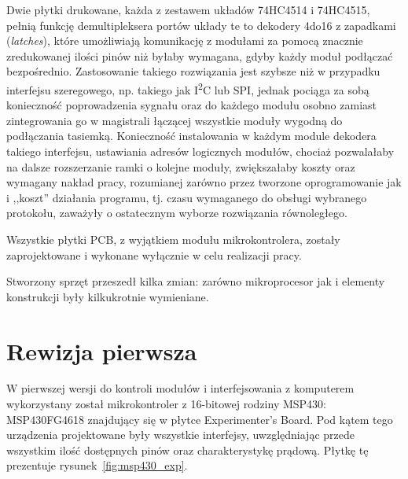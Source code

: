 Dwie płytki drukowane, każda z zestawem układów 74HC4514 i 74HC4515, pełnią funkcję demultipleksera portów \pauza układy te to dekodery 4\ppauza{}do\ppauza{}16 z zapadkami (\textsl{latches}), które umożliwiają komunikację z modułami za pomocą znacznie zredukowanej ilości pinów niż byłaby wymagana, gdyby każdy moduł podłączać bezpośrednio.
Zastosowanie takiego rozwiązania jest szybsze niż w przypadku interfejsu szeregowego, np. takiego jak I\textsuperscript{2}C lub SPI, jednak pociąga za sobą konieczność poprowadzenia sygnału  oraz  do każdego modułu osobno zamiast zintegrowania go w magistrali łączącej wszystkie moduły wygodną do podłączania tasiemką.
Konieczność instalowania w każdym module dekodera takiego interfejsu, ustawiania adresów logicznych modułów, chociaż pozwalałaby na dalsze rozszerzanie ramki o kolejne moduły, zwiększałaby koszty oraz wymagany nakład pracy, rozumianej zarówno przez tworzone oprogramowanie jak i ,,koszt'' działania programu, tj. czasu wymaganego do obsługi wybranego protokołu, zaważyły o ostatecznym wyborze rozwiązania równoległego.

Wszystkie płytki PCB, z wyjątkiem modułu mikrokontrolera, zostały zaprojektowane i wykonane wyłącznie w celu realizacji pracy.

Stworzony sprzęt przeszedł kilka zmian: zarówno mikroprocesor jak i elementy konstrukcji były kilkukrotnie wymieniane.\\

\section{Rewizja pierwsza}

W pierwszej wersji do kontroli modułów i interfejsowania z komputerem wykorzystany został mikrokontroler z 16-bitowej rodziny MSP430: MSP430FG4618 znajdujący się w płytce Experimenter's Board.
Pod kątem tego urządzenia projektowane były wszystkie interfejsy, uwzględniając przede wszystkim ilość dostępnych pinów oraz charakterystykę prądową.
Płytkę tę prezentuje rysunek~\ref{fig:msp430_exp}.

